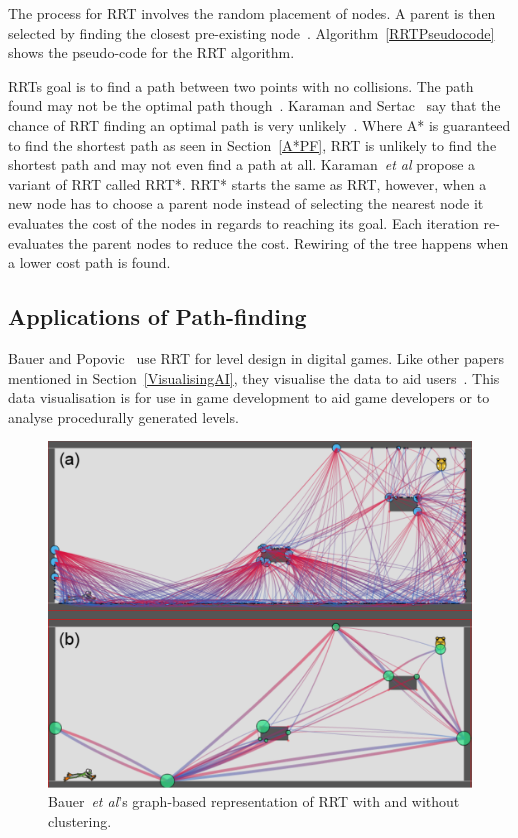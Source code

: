 \documentclass[journal]{IEEEtran}
\begin{document}
	The process for RRT involves the random placement of nodes. A parent is then selected by finding the closest pre-existing node~\cite{Kuffner2000}. Algorithm~\ref{RRTPseudocode} shows the pseudo-code for the RRT algorithm. 
	
	RRTs goal is to find a path between two points with no collisions.  The path found may not be the optimal path though~\cite{Kuffner2000, Karaman2011}. Karaman and Sertac~\cite{karaman2010} say that the chance of RRT finding an optimal path is very unlikely~\cite{karaman2010, Tremblay2014}. Where A* is guaranteed to find the shortest path as seen in Section~\ref{A*PF}, RRT is unlikely to find the shortest path and may not even find a path at all.  
	Karaman~\textit{et al} propose a variant of RRT called RRT*. RRT* starts the same as RRT, however, when a new node has to choose a parent node instead of selecting the nearest node it evaluates the cost of the nodes in regards to reaching its goal. Each iteration re-evaluates the parent nodes to reduce the cost. Rewiring of the tree happens when a lower cost path is found.
	
	\subsection{Applications of Path-finding} \label{AppPathfinding}
	Bauer and Popovic~\cite{bauer2012} use RRT for level design in digital games. Like other papers mentioned in Section~\ref{VisualisingAI}, they visualise the data to aid users~\cite{bauer2012, Haworth2010}. This data visualisation is for use in game development to aid game developers or to analyse procedurally generated levels. 
	
	\begin{figure}[h]
		\includegraphics[width=1.0\linewidth]{BauerRRT.png}
		\caption{ Bauer~\textit{et al}'s\cite{bauer2012} graph-based representation of RRT with and without clustering.}
		\label{BauerRRT}
	\end{figure} 
	
\end{document}
